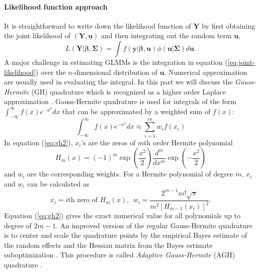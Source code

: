 \paragraph{Likelihood function approach}\label{para:likelihood-approach}
It is straightforward  to write down the likelihood function of $\bm Y$ by first obtaining the
joint likelihood of $(\bm Y, \bm u)$ and then integrating out the random term $\bm u$,
\begin{equation}\label{eq:joint-likelihood}
	L(\bm Y|\bm\beta, \bm \Sigma) = \int f(\bm y|\bm \beta, \bm u)\phi(\bm u|\bm \Sigma)d \bm u.
\end{equation}
A major challenge in estimating GLMMs is the integration in equation (\ref{eq:joint-likelihood})
over the $n$-dimensional distribution of $\bm u$. Numerical approximation are usually used in
evaluating the integral. In this part we will discuss the \textit{Gauss-Hermite} (GH) quadrature
which is recognized as a higher order Laplace approximation \citep{liu1994note}.
Gauss-Hermite quadrature is used for integrals of the form 
$\int_{-\infty}^{\infty}f(x) e^{-x^2}dx$ that can be approximated by a weighted sum of  $f(x)$:
\begin{equation}\label{eq:gh2}
	\int_{-\infty}^{\infty}f(x) e^{-x^2}dx \approx \sum_{i=1}^m w_if(x_i)
\end{equation}
In equation (\ref{eq:gh2}), $x_i$'s are the zeros of $m$th order Hermite polynomial 
\[H_m(x) = (-1)^m\exp(\dfrac{x^2}{2})\frac{d^m}{dx^m}\exp(-\dfrac{x^2}{2})\]
and $w_i$ are the corresponding weights. For a Hermite polynomial of degree $m$, $x_i$ and $w_i$
can be calculated as 	
\begin{equation}\label{eq:gh3}
	x_i = i\text{th zero of } H_m(x),~~  w_i = \frac{2^{m-1}m!\sqrt{\pi}}{m^2[H_{m-1}(x_i)]^2}. 
\end{equation}
Equation (\ref{eq:gh2}) gives the exact numerical value for all polynomials up to degree of
$2m-1$. 
An improved version of the regular Gauss-Hermite quadrature is to center and scale the quadrature
points  by the empirical Bayes estimate of the random effects and the Hessian matrix from the Bayes
estimate suboptimization \citep{liu1994note}. This procedure is called \textit{Adaptive
	Gauss-Hermite} (AGH) quadrature \citep{pinheiro1995approximations}. %

